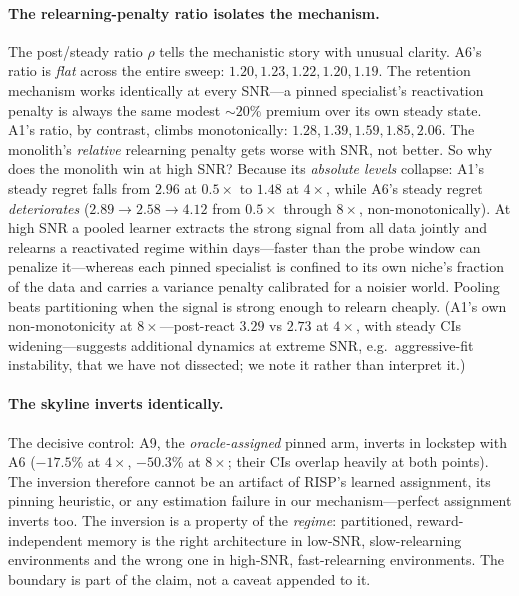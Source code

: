 \documentclass[11pt,a4paper]{article}
\theoremstyle{definition}
\theoremstyle{plain}
\begin{document}
\paragraph{The relearning-penalty ratio isolates the mechanism.} The
post/steady ratio $\rho$ tells the mechanistic story with unusual clarity.
A6's ratio is \emph{flat} across the entire sweep:
$1.20, 1.23, 1.22, 1.20, 1.19$. The retention mechanism works identically
at every SNR---a pinned specialist's reactivation penalty is always the
same modest $\sim\!20\%$ premium over its own steady state. A1's ratio, by
contrast, climbs monotonically: $1.28, 1.39, 1.59, 1.85, 2.06$. The
monolith's \emph{relative} relearning penalty gets worse with SNR, not
better. So why does the monolith win at high SNR? Because its
\emph{absolute levels} collapse: A1's steady regret falls from $2.96$ at
$0.5\times$ to $1.48$ at $4\times$, while A6's steady regret
\emph{deteriorates} ($2.89 \to 2.58 \to 4.12$ from $0.5\times$ through
$8\times$, non-monotonically). At high SNR a pooled learner extracts the
strong signal from all data jointly and relearns a reactivated regime
within days---faster than the probe window can penalize it---whereas each
pinned specialist is confined to its own niche's fraction of the data and
carries a variance penalty calibrated for a noisier world. Pooling beats
partitioning when the signal is strong enough to relearn cheaply. (A1's
own non-monotonicity at $8\times$---post-react $3.29$ vs $2.73$ at
$4\times$, with steady CIs widening---suggests additional dynamics at
extreme SNR, e.g.\ aggressive-fit instability, that we have not dissected;
we note it rather than interpret it.)

\paragraph{The skyline inverts identically.} The decisive control: A9, the
\emph{oracle-assigned} pinned arm, inverts in lockstep with A6 ($-17.5\%$
at $4\times$, $-50.3\%$ at $8\times$; their CIs overlap heavily at both
points). The inversion therefore cannot be an artifact of RISP's
learned assignment, its pinning heuristic, or any estimation failure in
our mechanism---perfect assignment inverts too. The inversion is a property
of the \emph{regime}: partitioned, reward-independent memory is the right
architecture in low-SNR, slow-relearning environments and the wrong one in
high-SNR, fast-relearning environments. The boundary is part of the claim,
not a caveat appended to it.
\end{document}

